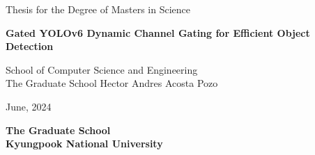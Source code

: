 \begin{titlepage}
    \begin{center}
    	\textmd{\large Thesis for the Degree of Masters in Science}  
        \vfill

        \textbf{\fontsize{21}{11}\selectfont Gated YOLOv6 Dynamic Channel Gating for Efficient Object Detection}  
        \vfill
        
        \textnormal{\large School of Computer Science and Engineering\\ The Graduate School          } 
        \vfill
        \textnormal{\Large Hector Andres Acosta Pozo}
        \vfill
        \vfill
        
        
        \textnormal{\large June, 2024}
        
        \textbf{\Large The Graduate School \\ Kyungpook National University}
        \vfill
    \end{center}
\end{titlepage}